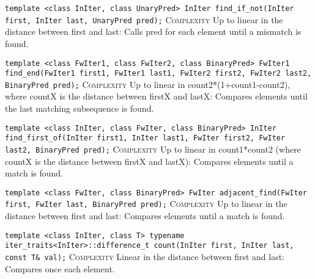\noindent{}\hspace*{0.25em}\lstinline[basicstyle=\ttfamily\color{corange}]{template <class InIter, class UnaryPred> InIter find_if_not(InIter first, InIter last, UnaryPred pred);} \textsc{Complexity} Up to linear in the distance between first and last: Calls pred for each element until a mismatch is found.\\\vspace{-0.6em}

\noindent{}\hspace*{0.25em}\lstinline[basicstyle=\ttfamily\color{corange}]{template <class FwIter1, class FwIter2, class BinaryPred> FwIter1 find_end(FwIter1 first1, FwIter1 last1, FwIter2 first2, FwIter2 last2, BinaryPred pred);} \textsc{Complexity} Up to linear in count2*(1+count1-count2), where countX is the distance between firstX and lastX: Compares elements until the last matching subsequence is found.\\\vspace{-0.6em}

\noindent{}\hspace*{0.25em}\lstinline[basicstyle=\ttfamily\color{corange}]{template <class InIter, class FwIter, class BinaryPred> InIter find_first_of(InIter first1, InIter last1, FwIter first2, FwIter last2, BinaryPred pred);} \textsc{Complexity} Up to linear in count1*count2 (where countX is the distance between firstX and lastX): Compares elements until a match is found.\\\vspace{-0.6em}

\noindent{}\hspace*{0.25em}\lstinline[basicstyle=\ttfamily\color{corange}]{template <class FwIter, class BinaryPred> FwIter adjacent_find(FwIter first, FwIter last, BinaryPred pred);} \textsc{Complexity} Up to linear in the distance between first and last: Compares elements until a match is found.\\\vspace{-0.6em}

\noindent{}\hspace*{0.25em}\lstinline[basicstyle=\ttfamily\color{corange}]{template <class InIter, class T> typename iter_traits<InIter>::difference_t count(InIter first, InIter last, const T& val);} \textsc{Complexity} Linear in the distance between first and last: Compares once each element.\\\vspace{-0.6em}

